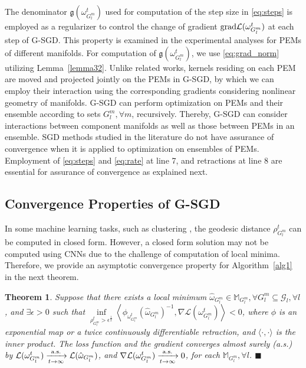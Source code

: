\documentclass[10pt,journal,compsoc]{IEEEtran}
\newcommand{\gr}{{\rm grad}}
\newtheorem{theorem}{Theorem}[section]
\theoremstyle{definition}
\theoremstyle{definition}
\theoremstyle{remark}
\theoremstyle{remark}
\theoremstyle{remark}
\newcommand*{\QEDbs}{\hfill\ensuremath{\blacksquare}}%
\begin{document}
The denominator  $\mathfrak{g}(\omega_{G^m_l}^t)$ used for computation of the step size in \eqref{eq:steps} is employed as a regularizer to control the change of gradient $\gr \mathcal{L}(\omega_{G^m_l}^{t})$ at each step of G-SGD. This property is examined in the experimental analyses for PEMs of different manifolds. For computation of $\mathfrak{g}(\omega_{G^m_l}^t)$, we use \eqref{eq:grad_norm} utilizing Lemma~\ref{lemma32}. Unlike related works, kernels residing on each PEM are moved and projected jointly on the PEMs in G-SGD, by which we can employ their interaction using the corresponding gradients considering nonlinear geometry of manifolds. G-SGD can perform optimization on PEMs and their ensemble according to sets $G^m_l, \forall m$, recursively. Thereby, G-SGD can consider interactions between component manifolds as well as those between PEMs in an ensemble. SGD methods studied in the literature do not have assurance of convergence when it is applied to optimization on ensembles of PEMs. Employment of \eqref{eq:steps} and \eqref{eq:rate} at line 7, and retractions at line 8 are essential for assurance of convergence as explained next. 
\subsection{Convergence Properties of G-SGD}
In some machine learning tasks, such as clustering \cite{sgdman,zhangSra16a}, the geodesic distance $\rho_{G^m_l}^{t}$ can be computed in closed form. However, a closed form solution may not be computed using CNNs due to the challenge of computation of local minima. Therefore, we provide an asymptotic convergence property for Algorithm~\ref{alg1} in the next theorem.   


 
 \begin{theorem}
 	\label{thm33}
 	Suppose that there exists a local minimum $\hat{\omega}_{G^m_l} \in \mathbb{M}_{G^m_l}, \forall G^m_l \subseteq \mathcal{G}_l, \forall l$, and $\exists \epsilon>0$ such that $\inf \limits _{\rho_{G^m_l}^{t} > \epsilon^{\frac{1}{2}}} \left\langle \phi_{\omega_{G^m_l}^t}(\hat{\omega}_{G^m_l})^{-1}, \nabla \mathcal{L}(\omega_{G^m_l}^t) \right\rangle <0$, where $\phi$ is an exponential map or a twice continuously differentiable retraction, and $\langle \cdot,\cdot \rangle$ is the inner product. The loss function and the gradient converges almost surely (a.s.) by $\mathcal{L}(\omega^t_{G^m_l}) \xrightarrow[t \to \infty]{\rm a.s.} \mathcal{L}(\hat{\omega}_{G^m_l})$, and $\nabla \mathcal{L}(\omega^t_{G^m_l}) \xrightarrow[t \to \infty]{\rm a.s.} 0$, for each $\mathbb{M}_{G^m_l}, \forall l$. \QEDbs
 	
  \end{theorem}
\end{document}

